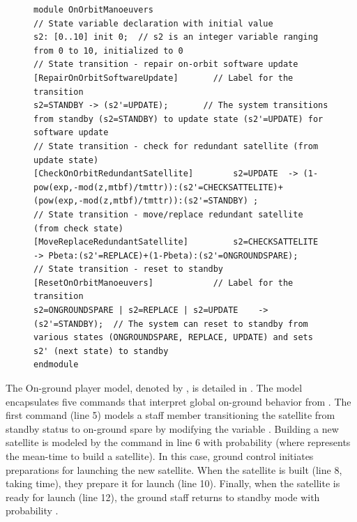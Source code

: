 \begin{figure}[!htb]            
\begin{minipage}{9cm}
\begin{lstlisting}[style=framed,%customc,
	caption=OnOrbit Satellite Manoeuvers,
 	label=CSGSatteliteModelOnOrbitManoeuvers]	
module OnOrbitManoeuvers
// State variable declaration with initial value
s2: [0..10] init 0;  // s2 is an integer variable ranging from 0 to 10, initialized to 0
// State transition - repair on-orbit software update
[RepairOnOrbitSoftwareUpdate]   	// Label for the transition
s2=STANDBY -> (s2'=UPDATE);       // The system transitions from standby (s2=STANDBY) to update state (s2'=UPDATE) for software update
// State transition - check for redundant satellite (from update state)
[CheckOnOrbitRedundantSatellite]        s2=UPDATE  -> (1-pow(exp,-mod(z,mtbf)/tmttr)):(s2'=CHECKSATTELITE)+(pow(exp,-mod(z,mtbf)/tmttr)):(s2'=STANDBY) ;
// State transition - move/replace redundant satellite (from check state)
[MoveReplaceRedundantSatellite]         s2=CHECKSATTELITE           -> Pbeta:(s2'=REPLACE)+(1-Pbeta):(s2'=ONGROUNDSPARE);
// State transition - reset to standby
[ResetOnOrbitManoeuvers]       		// Label for the transition
s2=ONGROUNDSPARE | s2=REPLACE | s2=UPDATE    -> (s2'=STANDBY);  // The system can reset to standby from various states (ONGROUNDSPARE, REPLACE, UPDATE) and sets s2' (next state) to standby
endmodule
\end{lstlisting}
 \end{minipage}  
\end{figure}

The On-ground player model, denoted by , is detailed in  . The model encapsulates five commands that interpret global on-ground behavior from . The first command (line 5) models a staff member transitioning the satellite from standby status to on-ground spare by modifying the variable . Building a new satellite is modeled by the command in line 6 with probability (where represents the mean-time to build a satellite). In this case, ground control initiates preparations for launching the new satellite. When the satellite is built (line 8, taking  time), they prepare it for launch (line 10). Finally, when the satellite is ready for launch (line 12), the ground staff returns to standby mode with probability .
 

